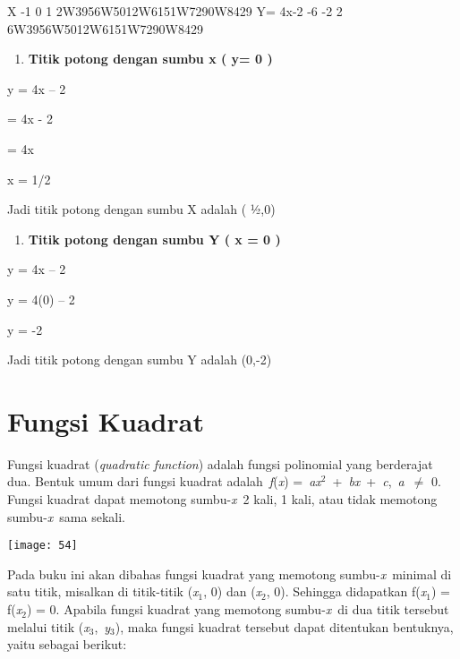 \documentclass[11pt,fleqn]{book} %
\begin{document}
\noindent 

 X -1 0 1 2W3956W5012W6151W7290W8429 Y= 4x-2 -6 -2 2 6W3956W5012W6151W7290W8429

\begin{enumerate}
\item  \textbf{Titik potong dengan sumbu x ( y= 0 )}
\end{enumerate}

\noindent \textbf{}

\noindent y = 4x -- 2

 = 4x - 2

 = 4x

\noindent x =  1/2

\noindent Jadi titik potong dengan sumbu X adalah ( ½,0)

\noindent 

\begin{enumerate}
\item  \textbf{Titik potong dengan sumbu Y ( x = 0 )}
\end{enumerate}

\noindent y = 4x -- 2

\noindent y = 4(0) -- 2

\noindent y = -2

\noindent Jadi titik potong dengan sumbu Y adalah (0,-2)

\noindent 

\noindent 

\noindent

\section{Fungsi Kuadrat}

\noindent Fungsi kuadrat (\textit{quadratic function}) adalah fungsi polinomial yang berderajat dua. Bentuk umum dari fungsi kuadrat adalah~\textit{f}(\textit{x}) =~\textit{ax}${}^{2}$~+~\textit{bx}~+~\textit{c},~\textit{a}~$\mathrm{\neq}$ 0. Fungsi kuadrat dapat memotong sumbu-\textit{x}~2 kali, 1 kali, atau tidak memotong sumbu-\textit{x}~sama sekali.

\begin{center}
\noindent \texttt{[image: 54]}
\end{center}

\noindent Pada buku ini akan dibahas fungsi kuadrat yang memotong sumbu-\textit{x}~minimal di satu titik, misalkan di titik-titik (\textit{x}${}_{1}$, 0) dan (\textit{x}${}_{2}$, 0). Sehingga didapatkan f(\textit{x}${}_{1}$) = f(\textit{x}${}_{2}$) = 0. Apabila fungsi kuadrat yang memotong sumbu-\textit{x}~di dua titik tersebut melalui titik (\textit{x}${}_{3}$,~\textit{y}${}_{3}$), maka fungsi kuadrat tersebut dapat ditentukan bentuknya, yaitu sebagai berikut:
\end{document}
